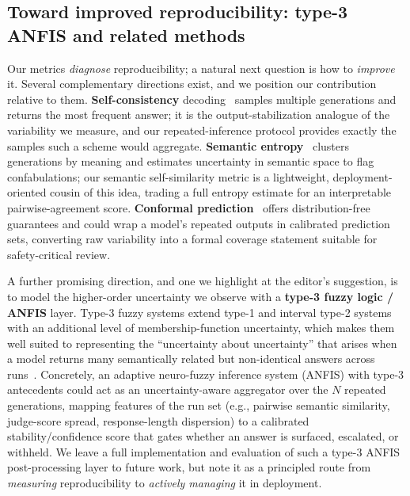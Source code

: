 \documentclass[11pt]{article}
\begin{document}
\subsection{Toward improved reproducibility: type-3 ANFIS and related methods}
\label{sec:improve}

Our metrics \emph{diagnose} reproducibility; a natural next question is
how to \emph{improve} it. Several complementary directions exist, and we
position our contribution relative to them. \textbf{Self-consistency}
decoding~\cite{wang2022selfconsistency, chen2023universal} samples
multiple generations and returns the most frequent answer; it is the
output-stabilization analogue of the variability we measure, and our
repeated-inference protocol provides exactly the samples such a scheme
would aggregate. \textbf{Semantic entropy}~\cite{farquhar2024semantic}
clusters generations by meaning and estimates uncertainty in semantic
space to flag confabulations; our semantic self-similarity metric is a
lightweight, deployment-oriented cousin of this idea, trading a full
entropy estimate for an interpretable pairwise-agreement score.
\textbf{Conformal prediction}~\cite{angelopoulos2021conformal} offers
distribution-free guarantees and could wrap a model's repeated outputs
in calibrated prediction sets, converting raw variability into a
formal coverage statement suitable for safety-critical review.

A further promising direction, and one we highlight at the editor's
suggestion, is to model the higher-order uncertainty we observe with a
\textbf{type-3 fuzzy logic / ANFIS} layer. Type-3 fuzzy
systems extend type-1 and interval type-2 systems with an additional
level of membership-function uncertainty, which makes them well suited
to representing the ``uncertainty about uncertainty'' that arises when a
model returns many semantically related but non-identical answers across
runs~\cite{mohammadzadeh2020type3, cao2021type3}. Concretely, an
adaptive neuro-fuzzy inference system (ANFIS) with type-3 antecedents
could act as an uncertainty-aware aggregator over the $N$ repeated
generations, mapping features of the run set (e.g., pairwise semantic
similarity, judge-score spread, response-length dispersion) to a
calibrated stability/confidence score that gates whether an answer is
surfaced, escalated, or withheld. We leave a full implementation and
evaluation of such a type-3 ANFIS post-processing layer to future work,
but note it as a principled route from \emph{measuring} reproducibility
to \emph{actively managing} it in deployment.
\end{document}
